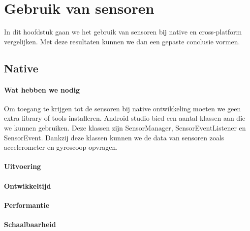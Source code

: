 
\chapter{Gebruik van sensoren}%
\label{ch:sensoren}

In dit hoofdstuk gaan we het gebruik van sensoren bij native en cross-platform vergelijken. 
Met deze resultaten kunnen we dan een gepaste conclusie vormen.

\section{Native}
\subsubsection{Wat hebben we nodig}
Om toegang te krijgen tot de sensoren bij native ontwikkeling moeten we geen extra library of tools installeren.
Android studio bied een aantal klassen aan die we kunnen gebruiken. Deze klassen zijn SensorManager, 
SensorEventListener en SensorEvent. Dankzij deze klassen kunnen we de data van sensoren zoals accelerometer en 
gyroscoop opvragen.

\subsubsection{Uitvoering}



\subsubsection{Ontwikkeltijd}



\subsubsection{Performantie}



\subsubsection{Schaalbaarheid}

